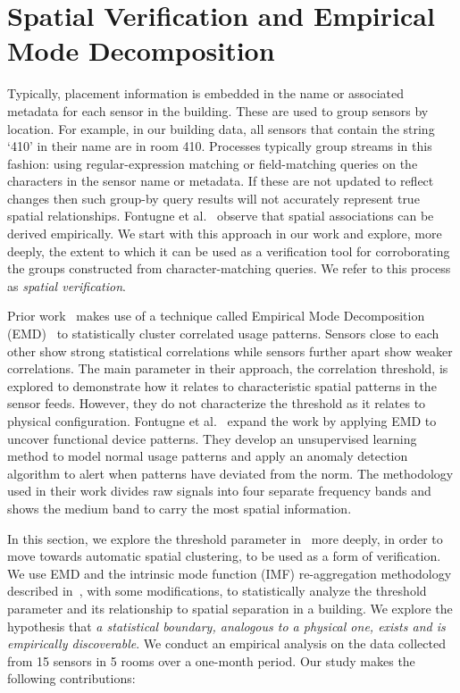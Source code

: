 \section{Spatial Verification and Empirical Mode Decomposition}





Typically, placement information is embedded in the name or associated metadata for each sensor in the building.
These are used to group sensors by location.  For example, in our building data, all sensors that contain the string
 `410' in their name are in room 410.  Processes typically group streams in this fashion: using regular-expression matching 
or field-matching queries on the characters in the sensor name or metadata.  If these are not updated to reflect changes
then such group-by query results will not accurately represent true spatial relationships.  
Fontugne et al.~\cite{IOT} observe that spatial associations can be derived empirically.  We start with this approach in our 
work and explore, more deeply, the extent to which it can be used 
as a verification tool for corroborating the groups constructed from character-matching queries.  We refer
to this process as \emph{spatial verification}.

Prior work~\cite{IOT} makes use of a technique called Empirical Mode Decomposition (EMD)~\cite{EMD} to statistically cluster correlated
usage patterns.  Sensors close to each other show strong statistical correlations while sensors further apart show weaker correlations.  
The main parameter in their approach, the correlation threshold, is explored to demonstrate how it relates to characteristic spatial patterns
 in the sensor feeds.  However, they do not characterize the threshold as it relates to physical configuration.
Fontugne et al.~\cite{SBS} expand the work by applying EMD to uncover functional device patterns.  They develop
an unsupervised learning method to model normal usage patterns and apply an anomaly detection algorithm to alert when patterns
have deviated from the norm.  The methodology used in their work divides raw signals into four separate frequency bands
and shows the medium band to carry the most spatial information.

In this section, we explore the threshold parameter in~\cite{IOT} more deeply, in order to move towards automatic spatial clustering, 
to be used as a form of verification. We use EMD and the intrinsic mode function (IMF) re-aggregation methodology described in~\cite{SBS}, with some modifications, to statistically analyze the threshold parameter
and its relationship to spatial separation in a building.  We explore the hypothesis that \emph{a statistical boundary, analogous to a physical one,
exists and is empirically discoverable}.
We conduct an empirical analysis on the data collected from 15 sensors in 5 rooms over a one-month period.  Our study makes the following contributions:

